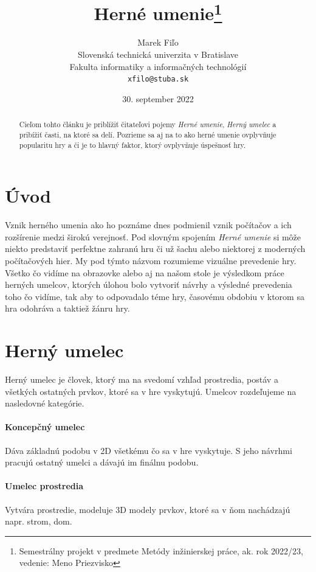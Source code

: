 \documentclass[10pt,twoside,slovak,a4paper]{article}
\title{Herné umenie\thanks{Semestrálny projekt v predmete Metódy inžinierskej práce, ak. rok 2022/23, vedenie: Meno Priezvisko}} %
\author{Marek Fiľo\\[2pt]
	{\small Slovenská technická univerzita v Bratislave}\\
	{\small Fakulta informatiky a informačných technológií}\\
	{\small \texttt{xfilo@stuba.sk}}
	}
\date{\small 30. september 2022} %
\begin{document}
\maketitle

\begin{abstract}


Cieľom tohto článku je priblížiť čitateľovi pojemy \emph{Herné umenie}, \emph{Herný umelec} a pribížiť časti, na ktoré sa delí. Pozrieme sa aj na to ako herné umenie ovplyvňuje popularitu hry a či je to hlavný faktor, ktorý ovplyvňuje úspešnosť hry.
\end{abstract}




\section{Úvod} \label{začiatok}
Vznik herného umenia ako ho poznáme dnes podmienil vznik počítačov a ich rozšírenie medzi širokú verejnosť.
Pod slovným spojením  \emph{Herné umenie} si môže niekto predstaviť perfektne zahranú hru či už šachu alebo niektorej z moderných počítačových hier. My pod týmto názvom rozumieme vizuálne prevedenie hry. Všetko čo vidíme na obrazovke alebo aj na našom stole je výsledkom práce herných umelcov, ktorých úlohou bolo vytvoriť návrhy a výsledné prevedenia toho čo vidíme, tak aby to odpovadalo téme hry, časovému obdobiu v ktorom sa hra odohráva a taktiež žánru hry.














\section{Herný umelec} \label{pokračovanie}
Herný umelec je človek, ktorý ma na svedomí vzhľad prostredia, postáv a všetkých ostatných prvkov, ktoré sa v hre vyskytujú. Umelcov rozdeľujeme na nasledovné kategórie.
\paragraph{Koncepčný umelec} Dáva základnú podobu v 2D všetkému čo sa v hre vyskytuje. S jeho návrhmi pracujú ostatný umelci a dávajú im finálnu podobu.

\paragraph{Umelec prostredia} Vytvára prostredie, modeluje 3D modely prvkov, ktoré sa v ňom nachádzajú napr. strom, dom.
\end{document}
